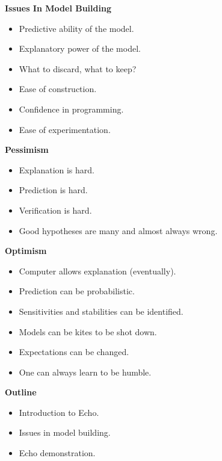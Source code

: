 %
%
\begin{slide}{}
\centerline{\bf Issues In Model Building}
\begin{itemize}
\vskip 15pt
\itemsep 0pt
\parsep  0pt
\parskip 0pt
\item Predictive ability of the model.
\vskip 6pt
\item Explanatory power of the model.
\vskip 6pt
\item What to discard, what to keep?
\vskip 6pt
\item Ease of construction.
\vskip 6pt
\item Confidence in programming.
\vskip 6pt
\item Ease of experimentation.
\end{itemize}
\end{slide}

%
%
\begin{slide}{}
\centerline{\bf Pessimism}
\begin{itemize}
\vskip 15pt
\itemsep 0pt
\parsep  0pt
\parskip 0pt
\item Explanation is hard.
\vskip 6pt
\item Prediction is hard.
\vskip 6pt
\item Verification is hard.
\vskip 6pt
\item Good hypotheses are many and almost always wrong.
\end{itemize}
\end{slide}

%
%
\begin{slide}{}
\centerline{\bf Optimism}
\begin{itemize}
\vskip 15pt
\itemsep 0pt
\parsep  0pt
\parskip 0pt
\item Computer allows explanation (eventually).
\vskip 6pt
\item Prediction can be probabilistic.
\vskip 6pt
\item Sensitivities and stabilities can be identified.
\vskip 6pt
\item Models can be kites to be shot down.
\vskip 6pt
\item Expectations can be changed.
\vskip 6pt
\item One can always learn to be humble.
\end{itemize}
\end{slide}

%
%
\begin{slide}{}
\centerline{\bf Outline}
\begin{itemize}
\vskip 15pt
\itemsep 0pt
\parsep  0pt
\parskip 0pt
\item Introduction to Echo.
\vskip 6pt
\item Issues in model building.
\vskip 6pt
\item Echo demonstration.
\end{itemize}
\end{slide}

